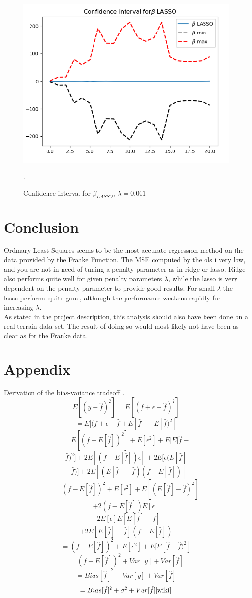 \documentclass[a4paper,11pt,twocolumn]{article}
\begin{document}
\begin{figure}[h]
\centering
\includegraphics[scale=0.75]{conflasso}
\caption{Confidence interval for $\beta_{LASSO}$, $\lambda=0.001$}.
\label{conflasso}
\end{figure}


\section{Conclusion}

Ordinary Least Squares seems to be the most accurate regression method on the data provided by the Franke Function. The MSE computed by the ols i very low, and you are not in need of tuning a penalty parameter as in ridge or lasso. Ridge also performs quite well for given penalty parameters $\lambda$,  while the lasso is very dependent on the penalty parameter to provide good results. For small $\lambda$ the lasso performs quite good, although the performance weakens rapidly for increasing $\lambda$. 
\\
As stated in the project description, this analysis should also have been done on a real terrain data set. The result of doing so would most likely not have been as clear as for the Franke data. 

\section{Appendix}

Derivation of the bias-variance tradeoff \cite{wiki}. 
$$E[(y-\hat{f})^2]=E[(f+\epsilon-\hat{f})^2]$$
$$=E[(f+\epsilon-\hat{f}+E[\hat{f}]-E[\hat{f})^2]$$
$$=E[(f-E[\hat{f}])^2]+E[\epsilon^2]+E[E[\hat{f}-$$
$$\hat{f})^2]+2E[(f-E[\hat{f}])\epsilon]+2E[\epsilon(E[\hat{f}]$$ $$-\hat{f})]+2E[(E[\hat{f}]-\hat{f})(f-E[\hat{f}])]$$
$$=(f-E[\hat{f}])^2+E[\epsilon^2]+E[(E[\hat{f}]-\hat{f})^2]$$   $$+2(f-E[\hat{f}])E[\epsilon]$$
$$+2E[\epsilon]E[E[\hat{f}]-\hat{f}]$$
$$+2E[E[\hat{f}]-\hat{f}](f-E[\hat{f}])$$
$$=(f-E[\hat{f}])^2+E[\epsilon^2]+E[E[\hat{f}-\hat{f})^2]$$
$$=(f-E[\hat{f}])^2+Var[y]+Var[\hat{f}]$$
$$=Bias[\hat{f}]^2+Var[y]+Var[\hat{f}]$$
$$=Bias[\hat{f}]^2+\sigma^2+Var[\hat{f}]\cite{wiki}$$
\end{document}
